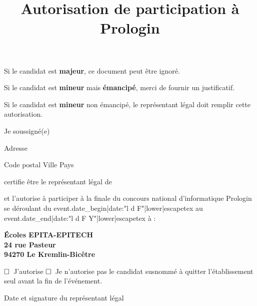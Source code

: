 \documentclass[a4paper,11pt]{prologin}
\title{Autorisation de participation à Prologin}
\newcommand\checkbox{$\Huge\square$~}
\begin{document}
\begin{tcolorbox}
Si le candidat est \textbf{majeur}, ce document peut être ignoré.

Si le candidat est \textbf{mineur} mais \textbf{émancipé}, merci de fournir un justificatif.

Si le candidat est \textbf{mineur} non émancipé, le représentant légal doit remplir cette autorisation.
\end{tcolorbox}
\vspace{2.5\baselineskip}

Je soussigné(e) \hrulefill

Adresse \hrulefill

Code postal \hrulefill{} Ville \hrulefill\hrulefill\hrulefill{} Pays \hrulefill\hrulefill

certifie être le représentant légal de \hrulefill

et l'autorise à participer à la finale du concours national d'informatique Prologin se déroulant
du {{ event.date_begin|date:"l d F"|lower|escapetex }} au {{ event.date_end|date:"l d F Y"|lower|escapetex }} à :

\begin{center}
    \textbf{Écoles EPITA-EPITECH}\\
    \textbf{24 rue Pasteur}\\
    \textbf{94270 Le Kremlin-Bicêtre}
\end{center}

\checkbox J'autorise\hspace{1em} \checkbox Je n'autorise pas\hspace{1em} le
candidat susnommé à quitter l'établissement seul avant la fin de l'événement.

\begin{signatureframe}{Date et signature du représentant légal}\end{signatureframe}
\end{document}
